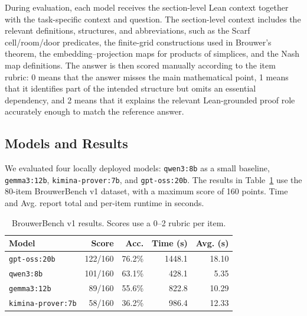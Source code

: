 \documentclass{article}
\theoremstyle{definition}
\begin{document}
During evaluation, each model receives the section-level Lean context together with the task-specific context and question. The section-level context includes the relevant definitions, structures, and abbreviations, such as the Scarf cell/room/door predicates, the finite-grid constructions used in Brouwer's theorem, the embedding--projection maps for products of simplices, and the Nash map definitions. The answer is then scored manually according to the item rubric: 0 means that the answer misses the main mathematical point, 1 means that it identifies part of the intended structure but omits an essential dependency, and 2 means that it explains the relevant Lean-grounded proof role accurately enough to match the reference answer.

\subsection{Models and Results}

We evaluated four locally deployed models: \texttt{qwen3:8b} as a small baseline, \texttt{gemma3:12b}, \texttt{kimina-prover:7b}, and \texttt{gpt-oss:20b}. The results in Table~\ref{tab:brouwerbench-v1-models} use the 80-item BrouwerBench v1 dataset, with a maximum score of 160 points. Time and Avg. report total and per-item runtime in seconds.

\begin{table}[H]
  \caption{BrouwerBench v1 results. Scores use a 0--2 rubric per item.}
  \label{tab:brouwerbench-v1-models}
  \begin{center}
    \begin{scriptsize}
      \begin{tabular}{lrrrr}
        \toprule
        Model & Score & Acc. & Time (s) & Avg. (s) \\
        \midrule
        \texttt{gpt-oss:20b} & 122/160 & 76.2\% & 1448.1 & 18.10 \\
        \texttt{qwen3:8b} & 101/160 & 63.1\% & 428.1 & 5.35 \\
        \texttt{gemma3:12b} & 89/160 & 55.6\% & 822.8 & 10.29 \\
        \texttt{kimina-prover:7b} & 58/160 & 36.2\% & 986.4 & 12.33 \\
        \bottomrule
      \end{tabular}
    \end{scriptsize}
  \end{center}
  \vskip -0.1in
\end{table}
\end{document}
